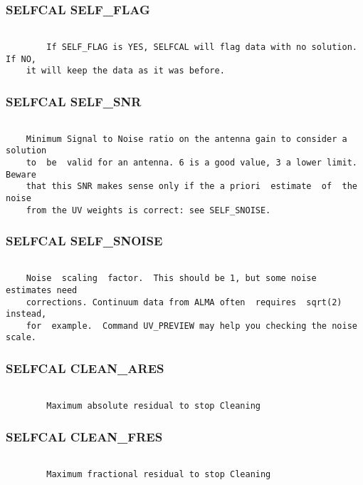 \subsubsection{SELFCAL SELF\_FLAG}
\begin{verbatim}

        If SELF_FLAG is YES, SELFCAL will flag data with no solution. If NO,
    it will keep the data as it was before.

\end{verbatim}
\subsubsection{SELFCAL SELF\_SNR}
\begin{verbatim}

    Minimum Signal to Noise ratio on the antenna gain to consider a solution
    to  be  valid for an antenna. 6 is a good value, 3 a lower limit. Beware
    that this SNR makes sense only if the a priori  estimate  of  the  noise
    from the UV weights is correct: see SELF_SNOISE.

\end{verbatim}
\subsubsection{SELFCAL SELF\_SNOISE}
\begin{verbatim}

    Noise  scaling  factor.  This should be 1, but some noise estimates need
    corrections. Continuum data from ALMA often  requires  sqrt(2)  instead,
    for  example.  Command UV_PREVIEW may help you checking the noise scale.

\end{verbatim}
\subsubsection{SELFCAL CLEAN\_ARES}
\begin{verbatim}

        Maximum absolute residual to stop Cleaning

\end{verbatim}
\subsubsection{SELFCAL CLEAN\_FRES}
\begin{verbatim}

        Maximum fractional residual to stop Cleaning

\end{verbatim}
